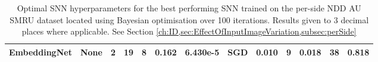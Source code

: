 \begin{table}[!ht]
{\begin{tabular}{ccccccccccccc}
			EmbeddingNet                                                       & None                                                                        & 2                                                                 & 19                                                                                     & 8                                                                                             & 0.162            & 6.430e-5                                                          & SGD               & 0.010                                                                            & 9                                                                                & 0.018             & 38                                                               & 0.818                                                                              \\
			\bottomrule                                                      
	\end{tabular}}
	\caption{Optimal SNN hyperparameters for the best performing SNN trained on the per-side NDD AU SMRU dataset located using Bayesian optimisation over 100 iterations. Results given to 3 decimal places where applicable. See Section \ref{ch:ID,sec:EffectOfInputImageVariation,subsec:perSide}}
\end{table}

